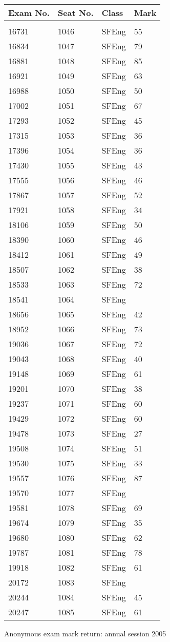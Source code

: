 \documentclass[a4paper]{article}
\begin{document}
\begin{tabular}{llll}
Exam No.&Seat No.&Class&Mark\\[3pt]
 \hline\\[3pt]
16731&1046&SFEng&55\\
16834&1047&SFEng&79\\
16881&1048&SFEng&85\\
16921&1049&SFEng&63\\
16988&1050&SFEng&50\\
17002&1051&SFEng&67\\
17293&1052&SFEng&45\\
17315&1053&SFEng&36\\
17396&1054&SFEng&36\\
17430&1055&SFEng&43\\
17555&1056&SFEng&46\\
17867&1057&SFEng&52\\
17921&1058&SFEng&34\\
18106&1059&SFEng&50\\
18390&1060&SFEng&46\\
18412&1061&SFEng&49\\
18507&1062&SFEng&38\\
18533&1063&SFEng&72\\
18541&1064&SFEng&\\
18656&1065&SFEng&42\\
18952&1066&SFEng&73\\
19036&1067&SFEng&72\\
19043&1068&SFEng&40\\
19148&1069&SFEng&61\\
19201&1070&SFEng&38\\
19237&1071&SFEng&60\\
19429&1072&SFEng&60\\
19478&1073&SFEng&27\\
19508&1074&SFEng&51\\
19530&1075&SFEng&33\\
19557&1076&SFEng&87\\
19570&1077&SFEng&\\
19581&1078&SFEng&69\\
19674&1079&SFEng&35\\
19680&1080&SFEng&62\\
19787&1081&SFEng&78\\
19918&1082&SFEng&61\\
20172&1083&SFEng&\\
20244&1084&SFEng&45\\
20247&1085&SFEng&61\\
\end{tabular}
\newpage
\begin{center}
Anonymous exam mark return: annual session 2005
\end{center}
\end{document}
